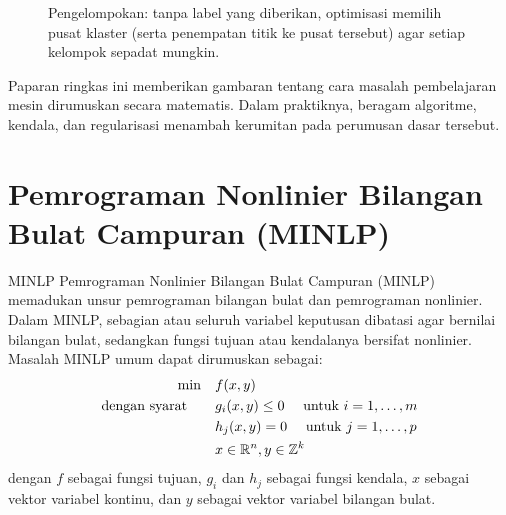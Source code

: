 \begin{figure}[h]
\centering
{}
\caption{Pengelompokan: tanpa label yang diberikan, optimisasi memilih pusat klaster (serta penempatan titik ke pusat tersebut) agar setiap kelompok sepadat mungkin.}
\label{fig:ml-clustering}
\end{figure}

Paparan ringkas ini memberikan gambaran tentang cara masalah pembelajaran mesin dirumuskan secara matematis. Dalam praktiknya, beragam algoritme, kendala, dan regularisasi menambah kerumitan pada perumusan dasar tersebut.

\Needspace{0.45\textheight}
\section{Pemrograman Nonlinier Bilangan Bulat Campuran (MINLP)}
\label{sec:intro-MINLP}

\begin{general}{MINLP}{\nphard}
Pemrograman Nonlinier Bilangan Bulat Campuran (MINLP) memadukan unsur pemrograman bilangan bulat dan pemrograman nonlinier. Dalam MINLP, sebagian atau seluruh variabel keputusan dibatasi agar bernilai bilangan bulat, sedangkan fungsi tujuan atau kendalanya bersifat nonlinier. Masalah MINLP umum dapat dirumuskan sebagai:
\begin{equation}
\label{eq:minlp}
\begin{split}
\min \quad & f(x, y)\\
\mbox{dengan syarat}\quad  \quad & g_i(x, y) \leq 0  \quad  \mbox{ untuk } i=1, \dots, m\\
           & h_j(x, y) = 0    \quad  \mbox{ untuk } j=1, \dots, p\\
           & x \in {\mathbb{R}}^n, y \in {\mathbb{Z}}^k
\end{split}
\end{equation}
dengan $f$ sebagai fungsi tujuan, $g_i$ dan $h_j$ sebagai fungsi kendala, $x$ sebagai vektor variabel kontinu, dan $y$ sebagai vektor variabel bilangan bulat.
\end{general}

